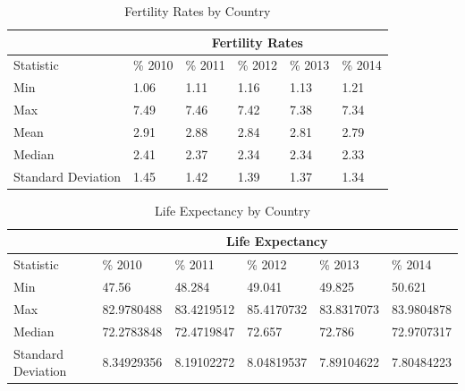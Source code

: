 \documentclass{article}
\begin{document}
\begin{table}[ht]
\centering
\begin{tabular}{|l|l|l|l|l|l|}
\hline
          &  \multicolumn{5}{c|}{Fertility Rates} \\ \hline
Statistic          &  \%  2010 &  \% 2011 &  \% 2012 &  \%  2013 & \% 2014 \\ \hline
Min                & 1.06                   & 1.11                   & 1.16                   & 1.13                   & 1.21                   \\ \hline
Max                & 7.49                   & 7.46                   & 7.42                   & 7.38                   & 7.34                   \\ \hline
Mean               & 2.91                   & 2.88                   & 2.84                   & 2.81                   & 2.79                   \\ \hline
Median             & 2.41                   & 2.37                   & 2.34                   & 2.34                   & 2.33                   \\ \hline
Standard Deviation & 1.45                   & 1.42                   & 1.39                   & 1.37                   & 1.34                   \\ \hline
\end{tabular}
\caption{Fertility Rates by Country}
\label{summary-statistic-table-fertility}
\end{table}
\begin{multicols}{2}


\end{multicols}
\begin{table}[ht]
\centering
\begin{tabular}{|l|l|l|l|l|l|}
\hline
          &  \multicolumn{5}{c|}{Life Expectancy} \\ \hline
Statistic          &  \%  2010 &  \% 2011 &  \% 2012 &  \%  2013 & \% 2014 \\ \hline
Min                & 47.56                  & 48.284                 & 49.041                 & 49.825                 & 50.621                 \\ \hline
Max                & 82.9780488             & 83.4219512             & 85.4170732             & 83.8317073             & 83.9804878             \\ \hline
Median             & 72.2783848             & 72.4719847             & 72.657                 & 72.786                 & 72.9707317             \\ \hline
Standard Deviation & 8.34929356             & 8.19102272             & 8.04819537             & 7.89104622             & 7.80484223             \\ \hline
\end{tabular}
\caption{Life Expectancy by Country}
\label{summary-statistic-table-life}
\end{table}
\end{document}
